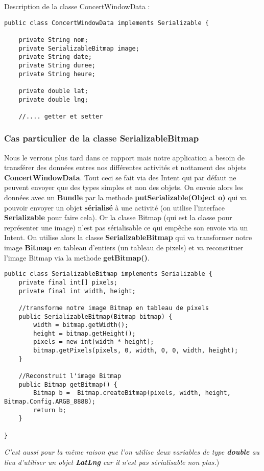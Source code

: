 \documentclass{article}
\begin{document}
Description de la classe ConcertWindowData : 
\begin{verbatim}
public class ConcertWindowData implements Serializable {

    private String nom;
    private SerializableBitmap image;
    private String date;
    private String duree;
    private String heure;

    private double lat;
    private double lng;
    
    //.... getter et setter 
\end{verbatim}
\subsubsection{Cas particulier de la classe SerializableBitmap} 
Nous le verrons plus tard dans ce rapport mais notre application a besoin de transférer des données entres nos différentes activités et nottament des objets \textbf{ConcertWindowData}. Tout ceci se fait via des Intent qui par défaut ne peuvent envoyer que des types simples et non des objets. On envoie alors les données avec un \textbf{Bundle} par la methode \textbf{putSerializable(Object o)} qui va pouvoir envoyer un objet \textbf{sérialisé} à une activité (on utilise l'interface \textbf{Serializable} pour faire cela). Or la classe Bitmap (qui est la classe pour représenter une image) n'est pas sérialisable ce qui empêche son envoie via un Intent. On utilise alors la classe \textbf{SerializableBitmap} qui va transformer notre image \textbf{Bitmap} en tableau d'entiers (un tableau de pixels) et va reconstituer l'image Bitmap via la methode \textbf{getBitmap()}.
\begin{verbatim}
public class SerializableBitmap implements Serializable {
    private final int[] pixels;
    private final int width, height;
    
    //transforme notre image Bitmap en tableau de pixels
    public SerializableBitmap(Bitmap bitmap) {
        width = bitmap.getWidth();
        height = bitmap.getHeight();
        pixels = new int[width * height];
        bitmap.getPixels(pixels, 0, width, 0, 0, width, height);
    }

    //Reconstruit l'image Bitmap
    public Bitmap getBitmap() {
        Bitmap b =  Bitmap.createBitmap(pixels, width, height, Bitmap.Config.ARGB_8888);
        return b;
	}

}
\end{verbatim}
\textit{C'est aussi pour la même raison que l'on utilise deux variables de type \textbf{double} au lieu d'utiliser un objet \textbf{LatLng} car il n'est pas sérialisable non plus.})
\end{document}
